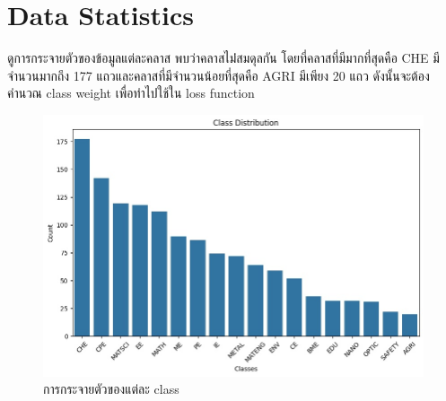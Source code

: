 \section{Data Statistics}
ดูการกระจายตัวของข้อมูลแต่ละคลาส พบว่าคลาสไม่่สมดุลกัน โดยที่คลาสที่มีมากที่สุดคือ CHE มีจำนวนมากถึง 177 แถวและคลาสที่มีจำนวนน้อยที่สุดคือ AGRI มีเพียง 20 แถว ดังนั้นจะต้องคำนวณ class weight เพื่อทำไปใช้ใน loss function
\begin{figure}[ht]
    \centering
    \includegraphics[width=\imgwidth]
    {images/class_distribution.jpg}
    \caption{การกระจายตัวของแต่ละ class}
    \label{fig:class_distribution}
\end{figure}


